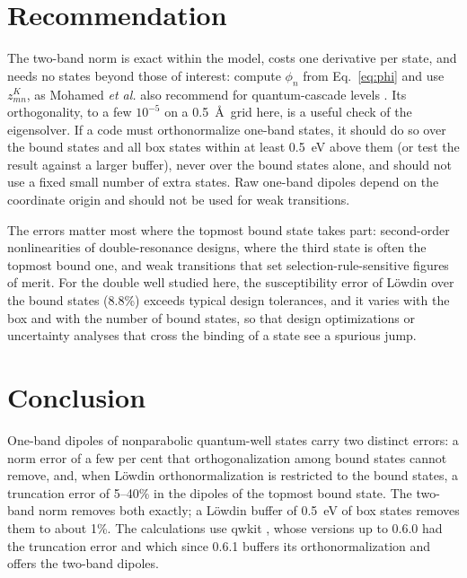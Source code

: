 \documentclass[11pt]{article}
\begin{document}
\section{Recommendation}
The two-band norm is exact within the model, costs one derivative per state, and needs no states beyond those of interest: compute $\phi_n$ from Eq.~\eqref{eq:phi} and use $z^K_{mn}$, as Mohamed \emph{et al.} also recommend for quantum-cascade levels \cite{Mohamed2024}. Its orthogonality, to a few $10^{-5}$ on a 0.5~\AA\ grid here, is a useful check of the eigensolver. If a code must orthonormalize one-band states, it should do so over the bound states and all box states within at least 0.5~eV above them (or test the result against a larger buffer), never over the bound states alone, and should not use a fixed small number of extra states. Raw one-band dipoles depend on the coordinate origin and should not be used for weak transitions.

The errors matter most where the topmost bound state takes part: second-order nonlinearities of double-resonance designs, where the third state is often the topmost bound one, and weak transitions that set selection-rule-sensitive figures of merit. For the double well studied here, the susceptibility error of L\"owdin over the bound states (8.8\%) exceeds typical design tolerances, and it varies with the box and with the number of bound states, so that design optimizations or uncertainty analyses that cross the binding of a state see a spurious jump.

\section{Conclusion}
One-band dipoles of nonparabolic quantum-well states carry two distinct errors: a norm error of a few per cent that orthogonalization among bound states cannot remove, and, when L\"owdin orthonormalization is restricted to the bound states, a truncation error of 5--40\% in the dipoles of the topmost bound state. The two-band norm removes both exactly; a L\"owdin buffer of 0.5~eV of box states removes them to about 1\%. The calculations use qwkit \cite{qwkit}, whose versions up to 0.6.0 had the truncation error and which since 0.6.1 buffers its orthonormalization and offers the two-band dipoles.



\end{document}
